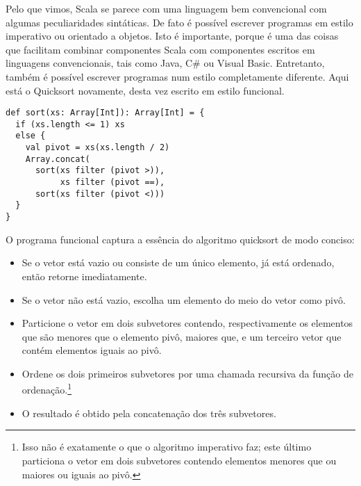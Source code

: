 Pelo que vimos, Scala se parece com uma linguagem bem convencional 
com algumas peculiaridades sint\'{a}ticas. De fato \'{e} poss\'{i}vel escrever
programas em estilo imperativo ou orientado a objetos. Isto \'{e} 
importante, porque \'{e} uma das coisas que facilitam combinar componentes
Scala com componentes escritos em linguagens convencionais, tais como Java,
C\# ou Visual Basic.
Entretanto, tamb\'{e}m \'{e} poss\'{i}vel escrever programas num estilo completamente
diferente. Aqui est\'{a} o Quicksort novamente, desta vez escrito em 
estilo funcional.
\begin{lstlisting}
def sort(xs: Array[Int]): Array[Int] = {
  if (xs.length <= 1) xs
  else {
    val pivot = xs(xs.length / 2)
    Array.concat(
      sort(xs filter (pivot >)),
           xs filter (pivot ==),
      sort(xs filter (pivot <)))
  }
}
\end{lstlisting}
O programa funcional captura a ess\^{e}ncia do algoritmo quicksort de modo conciso:
\begin{itemize}
\item Se o vetor est\'{a} vazio ou consiste de um \'{u}nico elemento, j\'{a} est\'{a} ordenado,
      ent\~{a}o retorne imediatamente.
\item Se o vetor n\~{a}o est\'{a} vazio, escolha um elemento do meio do vetor como piv\^{o}.
\item Particione o vetor em dois subvetores contendo, respectivamente os elementos
 que s\~{a}o menores que o elemento piv\^{o}, maiores que, e um terceiro vetor que cont\'{e}m
 elementos iguais ao piv\^{o}.
\item Ordene os dois primeiros subvetores por uma chamada recursiva da fun\c{c}\~{a}o de 
ordena\c{c}\~{a}o.\footnote{Isso n\~{a}o \'{e} exatamente o que o algoritmo imperativo faz; este 
\'{u}ltimo particiona o vetor em dois subvetores contendo elementos menores que ou 
maiores ou iguais ao piv\^{o}.}
\item O resultado \'{e} obtido pela concatena\c{c}\~{a}o dos tr\^{e}s subvetores.
\end{itemize}

